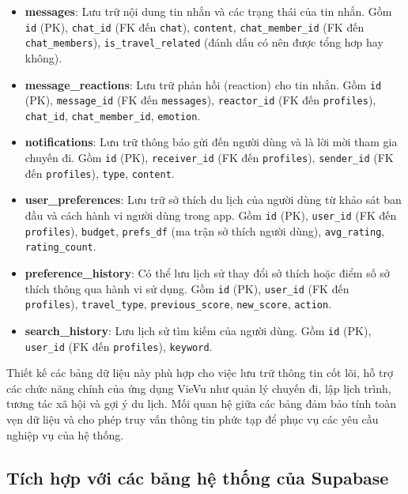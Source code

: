 \begin{itemize}
    \item \textbf{messages}: Lưu trữ nội dung tin nhắn và các trạng thái của tin nhắn. Gồm \texttt{id} (PK), \texttt{chat\_id} (FK đến \texttt{chat}), \texttt{content}, \texttt{chat\_member\_id} (FK đến \texttt{chat\_members}), \texttt{is\_travel\_related} (đánh dấu có nên được tổng hơp hay không).

    \item \textbf{message\_reactions}: Lưu trữ phản hồi (reaction) cho tin nhắn. Gồm \texttt{id} (PK), \texttt{message\_id} (FK đến \texttt{messages}), \texttt{reactor\_id} (FK đến \texttt{profiles}), \texttt{chat\_id}, \texttt{chat\_member\_id}, \texttt{emotion}.

    \item \textbf{notifications}: Lưu trữ thông báo gửi đến người dùng và là lời mời tham gia chuyến đi. Gồm \texttt{id} (PK), \texttt{receiver\_id} (FK đến \texttt{profiles}), \texttt{sender\_id} (FK đến \texttt{profiles}), \texttt{type}, \texttt{content}.

    \item \textbf{user\_preferences}: Lưu trữ sở thích du lịch của người dùng từ khảo sát ban đầu và cách hành vi người dùng trong app. Gồm \texttt{id} (PK), \texttt{user\_id} (FK đến \texttt{profiles}), \texttt{budget}, \texttt{prefs\_df} (ma trận sở thích người dùng), \texttt{avg\_rating}, \texttt{rating\_count}.

    \item \textbf{preference\_history}: Có thể lưu lịch sử thay đổi sở thích hoặc điểm số sở thích thông qua hành vi sử dụng. Gồm \texttt{id} (PK), \texttt{user\_id} (FK đến \texttt{profiles}), \texttt{travel\_type}, \texttt{previous\_score}, \texttt{new\_score}, \texttt{action}.

    \item \textbf{search\_history}: Lưu lịch sử tìm kiếm của người dùng. Gồm \texttt{id} (PK), \texttt{user\_id} (FK đến \texttt{profiles}), \texttt{keyword}.

   
\end{itemize}
\noindent
Thiết kế các bảng dữ liệu này phù hợp cho việc lưu trữ thông tin cốt lõi, hỗ trợ các chức năng chính của ứng dụng VieVu như quản lý chuyến đi, lập lịch trình, tương tác xã hội và gợi ý du lịch. Mối quan hệ giữa các bảng đảm bảo tính toàn vẹn dữ liệu và cho phép truy vấn thông tin phức tạp để phục vụ các yêu cầu nghiệp vụ của hệ thống.


\subsection{Tích hợp với các bảng hệ thống của Supabase}


